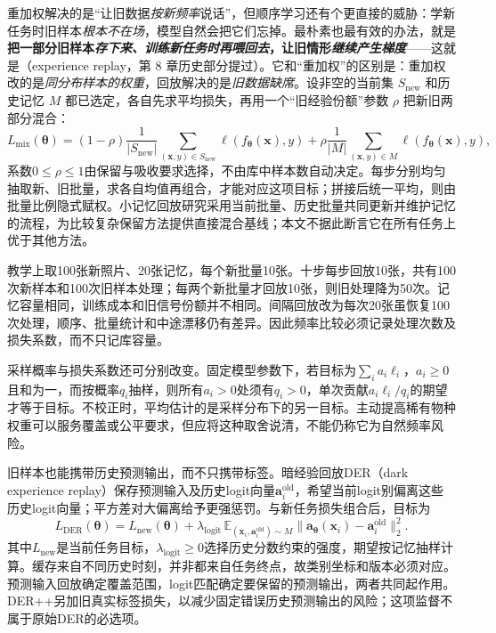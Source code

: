 重加权解决的是“让旧数据\emph{按新频率}说话”，但顺序学习还有个更直接的威胁：学新任务时旧样本\emph{根本不在场}，模型自然会把它们忘掉。最朴素也最有效的办法，就是\textbf{把一部分旧样本\emph{存下来、训练新任务时\emph{再喂}回去}，让旧情形\emph{继续产生梯度}}——这就是（experience replay，第 8 章历史部分提过）。它和“重加权”的区别是：重加权改的是\emph{同分布样本的\emph{权重}}，回放解决的是\emph{旧数据\emph{缺席}}。设非空的当前集 $S_{\mathrm{new}}$ 和历史记忆 $M$ 都已选定，各自先求平均损失，再用一个“旧经验份额”参数 $\rho$ 把新旧两部分混合：
\begin{equation}
L_{\mathrm{mix}}(\bm{\theta})
=(1-\rho)\frac{1}{|S_{\mathrm{new}}|}
\sum_{(\bm{x},y)\in S_{\mathrm{new}}}\ell(f_{\bm{\theta}}(\bm{x}),y)
+\rho\frac{1}{|M|}\sum_{(\bm{x},y)\in M}
\ell(f_{\bm{\theta}}(\bm{x}),y),
\label{eq:ket-update-replay}
\end{equation}
系数$0\leq\rho\leq1$由保留与吸收要求选择，不由库中样本数自动决定。每步分别均匀抽取新、旧批量，求各自均值再组合，才能对应这项目标；拼接后统一平均，则由批量比例隐式赋权。小记忆回放研究采用当前批量、历史批量共同更新并维护记忆的流程，为比较复杂保留方法提供直接混合基线；本文不据此断言它在所有任务上优于其他方法。

教学上取100张新照片、20张记忆，每个新批量10张。十步每步回放10张，共有100次新样本和100次旧样本处理；每两个新批量才回放10张，则旧处理降为50次。记忆容量相同，训练成本和旧信号份额并不相同。间隔回放改为每次20张虽恢复100次处理，顺序、批量统计和中途漂移仍有差异。因此频率比较必须记录处理次数及损失系数，而不只记库容量。

采样概率与损失系数还可分别改变。固定模型参数下，若目标为$\sum_i a_i\ell_i$，$a_i\geq0$且和为一，而按概率$q_i$抽样，则所有$a_i>0$处须有$q_i>0$，单次贡献$a_i\ell_i/q_i$的期望才等于目标。不校正时，平均估计的是采样分布下的另一目标。主动提高稀有物种权重可以服务覆盖或公平要求，但应将这种取舍说清，不能仍称它为自然频率风险。

旧样本也能携带历史预测输出，而不只携带标签。暗经验回放DER（dark experience replay）保存预测输入及历史logit向量$\bm a_i^{\mathrm{old}}$，希望当前logit别偏离这些历史logit向量；平方差对大偏离给予更强惩罚。与新任务损失组合后，目标为
\begin{equation}
L_{\mathrm{DER}}(\bm{\theta})
=L_{\mathrm{new}}(\bm{\theta})
+\lambda_{\mathrm{logit}}\,
\mathbb E_{(\bm{x}_i,\bm a_i^{\mathrm{old}})\sim M}
\lVert\bm a_{\bm{\theta}}(\bm{x}_i)-\bm a_i^{\mathrm{old}}\rVert_2^2.
\label{eq:ket-update-der}
\end{equation}
其中$L_{\mathrm{new}}$是当前任务目标，$\lambda_{\mathrm{logit}}\geq0$选择历史分数约束的强度，期望按记忆抽样计算。缓存来自不同历史时刻，并非都来自任务终点，故类别坐标和版本必须对应。预测输入回放确定覆盖范围，logit匹配确定要保留的预测输出，两者共同起作用。DER++另加旧真实标签损失，以减少固定错误历史预测输出的风险；这项监督不属于原始DER的必选项。

